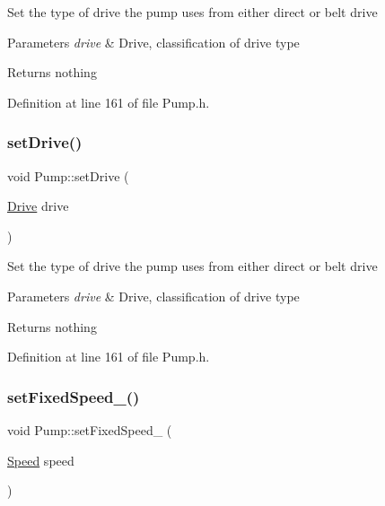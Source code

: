 Set the type of drive the pump uses from either direct or belt drive


\begin{DoxyParams}{Parameters}
{\em drive} & Drive, classification of drive type\\
\hline
\end{DoxyParams}
\begin{DoxyReturn}{Returns}
nothing 
\end{DoxyReturn}


Definition at line 161 of file Pump.\+h.

\mbox{\label{class_pump_a54b6fc1aa44cc8377914ccb94738723a}} 
\subsubsection{\texorpdfstring{set\+Drive()}{setDrive()}\hspace{0.1cm}{\footnotesize\ttfamily [3/3]}}
{\footnotesize\ttfamily void Pump\+::set\+Drive (\begin{DoxyParamCaption}\item[{\hyperlink{class_pump_a32bf0ade131a11bb3b3fb374f638e983}{Drive}}]{drive }\end{DoxyParamCaption})\hspace{0.3cm}{\ttfamily [inline]}}

Set the type of drive the pump uses from either direct or belt drive


\begin{DoxyParams}{Parameters}
{\em drive} & Drive, classification of drive type\\
\hline
\end{DoxyParams}
\begin{DoxyReturn}{Returns}
nothing 
\end{DoxyReturn}


Definition at line 161 of file Pump.\+h.

\mbox{\label{class_pump_a9e74b484f468a14076fb12d8b991e24b}} 
\subsubsection{\texorpdfstring{set\+Fixed\+Speed\+\_\+()}{setFixedSpeed\_()}\hspace{0.1cm}{\footnotesize\ttfamily [1/3]}}
{\footnotesize\ttfamily void Pump\+::set\+Fixed\+Speed\+\_\+ (\begin{DoxyParamCaption}\item[{\hyperlink{class_pump_ae443603074ebca82f0b89209482d10b6}{Speed}}]{speed }\end{DoxyParamCaption})\hspace{0.3cm}{\ttfamily [inline]}}


